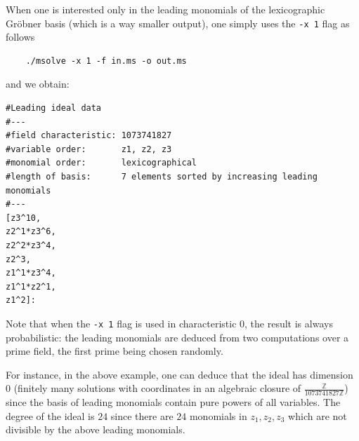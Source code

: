 \documentclass[a4paper,english,11pt]{scrartcl}
\theoremstyle{definition}
\theoremstyle{remark}
\begin{document}
When one is interested only in the leading monomials of the lexicographic Gr\"obner basis
(which is a way smaller output), one simply uses the \verb+-x 1+ flag as follows
\begin{tcolorbox} %
  \begin{verbatim}
    ./msolve -x 1 -f in.ms -o out.ms
  \end{verbatim}
\end{tcolorbox}
and we obtain:
\begin{tcolorbox} %
  \begin{lstlisting}
#Leading ideal data
#---
#field characteristic: 1073741827
#variable order:       z1, z2, z3
#monomial order:       lexicographical
#length of basis:      7 elements sorted by increasing leading monomials
#---
[z3^10,
z2^1*z3^6,
z2^2*z3^4,
z2^3,
z1^1*z3^4,
z1^1*z2^1,
z1^2]:
  \end{lstlisting}
\end{tcolorbox}
Note that when the \verb+-x 1+ flag is used in characteristic $0$, the result is
always probabilistic: the leading monomials are deduced from two computations
over a prime field, the first prime being chosen randomly.

For instance, in the above example, one can deduce that the ideal has dimension
$0$ (finitely many solutions with coordinates in an algebraic closure of
$\frac{\mathbb{Z}}{1073741827\mathbb{Z}}$) since the basis of leading monomials
contain pure powers of all variables. The degree of the ideal is $24$ since
there are $24$ monomials in $z_1, z_2, z_3$ which are not divisible by the above
leading monomials.
\end{document}
